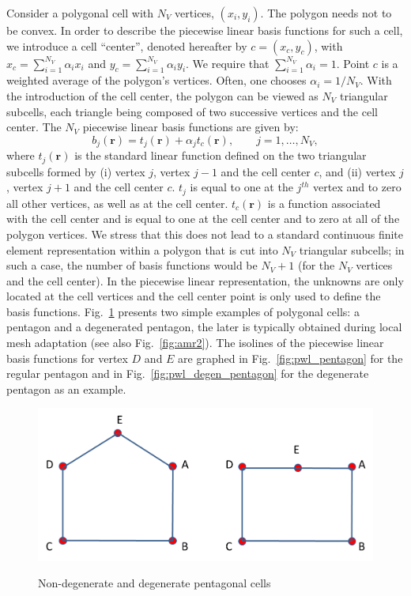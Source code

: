 \documentclass[preprint,10pt]{elsarticle}
\newcommand{\fig}[1]{Fig.~\ref{#1}}                      %
\newcommand\br{\mathbf{r}}
\renewcommand{\(}{\left(}
\renewcommand{\)}{\right)}
\renewcommand{\[}{\left[}
\renewcommand{\]}{\right]}
\begin{document}
Consider a polygonal cell with $N_V$ vertices, $(x_i,y_i)$. The polygon needs not 
to be convex. In order to describe the piecewise linear basis functions
for such a cell, we introduce a cell ``center'', denoted hereafter 
by $c=(x_c,y_c)$, with $x_c =\sum_{i=1}^{N_V} \alpha_{i} x_i$
and  $y_c = \sum_{i=1}^{N_V} \alpha_{i} y_i$. We require that
$\sum_{i=1}^{N_V} \alpha_{i} = 1$. Point $c$ is a weighted average
of the polygon's vertices. Often, one chooses $\alpha_i = 1 / N_V$.
With the introduction of the cell center, the polygon can be viewed as
$N_V$ triangular subcells, each triangle being composed of two
successive vertices and the cell center.
The $N_V$ piecewise linear basis functions are given by:
%
\begin{equation}
  b_j(\br) = t_j(\br) + \alpha_{j} t_c(\br) , \qquad j=1,\ldots,N_V ,
\end{equation}
%
where $t_j(\br)$ is the standard linear function defined on the two
triangular subcells formed by (i) vertex $j$, vertex $j-1$ and the cell center $c$,
and (ii) vertex $j$, vertex $j+1$ and the cell center $c$.
$t_j$ is equal to one at the $j^{th}$ vertex and to zero all other vertices,
as well as at the cell center.
$t_c(\br)$ is a function associated with the cell center and is equal to one 
at the cell center  and to zero at all of the polygon vertices.
%
We stress that this does not lead to a standard continuous finite element
representation within a polygon that is cut into $N_V$
triangular subcells; in such a case, the number of basis functions
would be $N_V+1$ (for the $N_V$ vertices and the cell center). In the
piecewise linear representation, the unknowns are only located at the cell 
vertices and the cell center point is only used to define the basis functions.
\fig{fig:pentagons} presents two simple examples of polygonal cells: a 
pentagon and a degenerated pentagon, the later is typically obtained
during local mesh adaptation (see also \fig{fig:amr2}).
The isolines of the piecewise linear basis functions for vertex $D$ and
$E$ are graphed in \fig{fig:pwl_pentagon} for the regular pentagon
and in \fig{fig:pwl_degen_pentagon} for the degenerate pentagon as an example.
%
\begin{figure}[H]
\centering
\includegraphics[scale=0.77]{pentagons.png}
\label{fig:pentagons}
\caption{Non-degenerate and degenerate pentagonal cells}
\end{figure}
\end{document}
